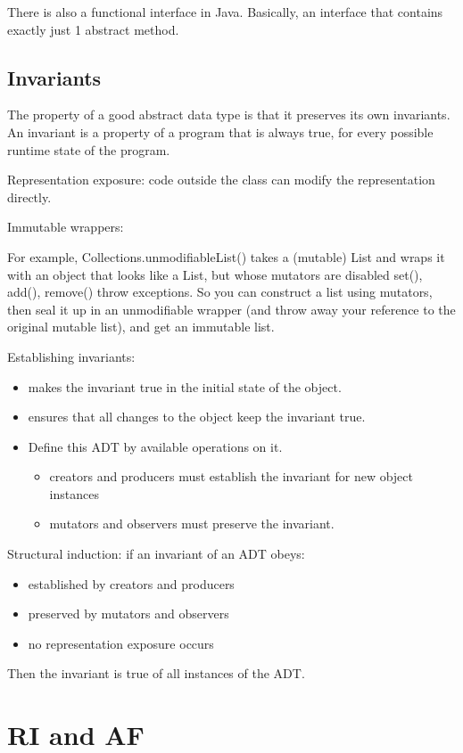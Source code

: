 \documentclass[letterpaper,12pt]{article}
\begin{document}
There is also a functional interface in Java. Basically, an interface that
contains exactly just 1 abstract method.

\subsection{Invariants}

The property of a good abstract data type is that it preserves its own invariants.
An invariant is a property of a program that is always true, for every possible
runtime state of the program.

Representation exposure: code outside the class can modify the representation
directly.

Immutable wrappers:

For example, Collections.unmodifiableList() takes a (mutable) List and wraps it
with an object that looks like a List, but whose mutators are disabled set(),
add(), remove() throw exceptions. So you can construct a list using mutators,
then seal it up in an unmodifiable wrapper (and throw away your reference to
the original mutable list), and get an immutable list.

Establishing invariants:
\begin{itemize}
      \item makes the invariant true in the initial state of the object.
      \item ensures that all changes to the object keep the invariant true.
      \item Define this ADT by available operations on it.
            \begin{itemize}
                  \item creators and producers must establish the invariant for new object instances
                  \item mutators and observers must preserve the invariant.
            \end{itemize}
\end{itemize}
Structural induction: if an invariant of an ADT obeys:
\begin{itemize}
      \item established by creators and producers
      \item preserved by mutators and observers
      \item no representation exposure occurs
\end{itemize}
Then the invariant is true of all instances of the ADT.
\section{RI and AF}
\end{document}
